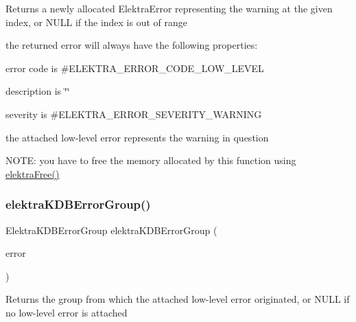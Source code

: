 \begin{DoxyReturn}{Returns}
a newly allocated Elektra\+Error representing the warning at the given index, or N\+U\+LL if the index is out of range
\end{DoxyReturn}
the returned error will always have the following properties\+:
\begin{DoxyItemize}
\item error code is \#\+E\+L\+E\+K\+T\+R\+A\+\_\+\+E\+R\+R\+O\+R\+\_\+\+C\+O\+D\+E\+\_\+\+L\+O\+W\+\_\+\+L\+E\+V\+EL
\item description is \char`\"{}\char`\"{}
\item severity is \#\+E\+L\+E\+K\+T\+R\+A\+\_\+\+E\+R\+R\+O\+R\+\_\+\+S\+E\+V\+E\+R\+I\+T\+Y\+\_\+\+W\+A\+R\+N\+I\+NG
\item the attached low-\/level error represents the warning in question
\end{DoxyItemize}

N\+O\+TE\+: you have to free the memory allocated by this function using \hyperlink{internal_8c_a7f572149d2e0bfe18023a6ac969f195c}{elektra\+Free()} \mbox{\label{group__highlevel_ga6c5c31f358cf4282fde53eee168e5331}} 
\subsubsection{\texorpdfstring{elektra\+K\+D\+B\+Error\+Group()}{elektraKDBErrorGroup()}}
{\footnotesize\ttfamily Elektra\+K\+D\+B\+Error\+Group elektra\+K\+D\+B\+Error\+Group (\begin{DoxyParamCaption}\item[{const Elektra\+Error $\ast$}]{error }\end{DoxyParamCaption})}

\begin{DoxyReturn}{Returns}
the group from which the attached low-\/level error originated, or N\+U\+LL if no low-\/level error is attached 
\end{DoxyReturn}
\mbox{\label{group__highlevel_ga39e5bc8ed336ccc37a7bcedcfcd65353}} 
